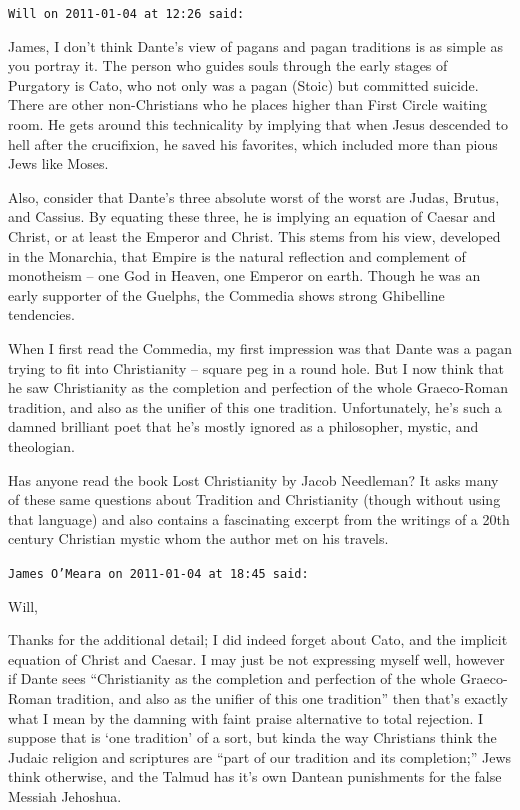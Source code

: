 \begin{footnotesize}
\begin{sffamily}
\hfill

\texttt{Will on 2011-01-04 at 12:26 said:}

James, I don't think Dante's view of pagans and pagan traditions is as simple as you portray it. The person who guides souls through the early stages of Purgatory is Cato, who not only was a pagan (Stoic) but committed suicide. There are other non-Christians who he places higher than First Circle waiting room. He gets around this technicality by implying that when Jesus descended to hell after the crucifixion, he saved his favorites, which included more than pious Jews like Moses.

Also, consider that Dante's three absolute worst of the worst are Judas, Brutus, and Cassius. By equating these three, he is implying an equation of Caesar and Christ, or at least the Emperor and Christ. This stems from his view, developed in the Monarchia, that Empire is the natural reflection and complement of monotheism -- one God in Heaven, one Emperor on earth. Though he was an early supporter of the Guelphs, the Commedia shows strong Ghibelline tendencies.

When I first read the Commedia, my first impression was that Dante was a pagan trying to fit into Christianity -- square peg in a round hole. But I now think that he saw Christianity as the completion and perfection of the whole Graeco-Roman tradition, and also as the unifier of this one tradition. Unfortunately, he's such a damned brilliant poet that he's mostly ignored as a philosopher, mystic, and theologian.

Has anyone read the book Lost Christianity by Jacob Needleman? It asks many of these same questions about Tradition and Christianity (though without using that language) and also contains a fascinating excerpt from the writings of a 20th century Christian mystic whom the author met on his travels.

\hfill

\texttt{James O'Meara on 2011-01-04 at 18:45 said:}

Will,

Thanks for the additional detail; I did indeed forget about Cato, and the implicit equation of Christ and Caesar. I may just be not expressing myself well, however if Dante sees ``Christianity as the completion and perfection of the whole Graeco-Roman tradition, and also as the unifier of this one tradition'' then that's exactly what I mean by the damning with faint praise alternative to total rejection. I suppose that is `one tradition' of a sort, but kinda the way Christians think the Judaic religion and scriptures are ``part of our tradition and its completion;'' Jews think otherwise, and the Talmud has it's own Dantean punishments for the false Messiah Jehoshua.


\end{sffamily}
\end{footnotesize}
